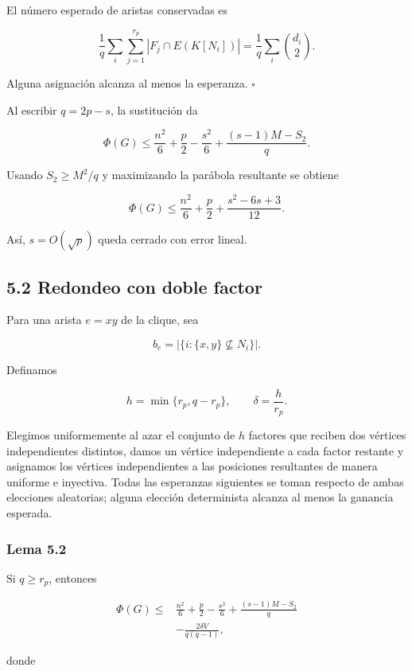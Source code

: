 \documentclass[
  11pt,
]{article}
\begin{document}
El número esperado de aristas conservadas es

\[
\frac1q\sum_i\sum_{j=1}^{r_p}|F_j\cap E(K[N_i])|
=
\frac1q\sum_i\binom{d_i}{2}.
\]

Alguna asignación alcanza al menos la esperanza. \(\square\)

Al escribir \(q=2p-s\), la sustitución da

\[
\Phi(G)
\le
\frac{n^2}{6}+\frac p2-\frac{s^2}{6}
+
\frac{(s-1)M-S_2}{q}.
\tag{5.2}
\]

Usando \(S_2\ge M^2/q\) y maximizando la parábola resultante se obtiene

\[
\boxed{
\Phi(G)
\le
\frac{n^2}{6}+\frac p2+\frac{s^2-6s+3}{12}.
}
\tag{5.3}
\]

Así, \(s=O(\sqrt p)\) queda cerrado con error lineal.

\subsection{5.2 Redondeo con doble
factor}\label{redondeo-con-doble-factor}

Para una arista \(e=xy\) de la clique, sea

\[
b_e=|\{i:\{x,y\}\not\subseteq N_i\}|.
\]

Definamos

\[
h=\min\{r_p,q-r_p\},
\qquad
\delta=\frac h{r_p}.
\]

Elegimos uniformemente al azar el conjunto de \(h\) factores que reciben
dos vértices independientes distintos, damos un vértice independiente a
cada factor restante y asignamos los vértices independientes a las
posiciones resultantes de manera uniforme e inyectiva. Todas las
esperanzas siguientes se toman respecto de ambas elecciones aleatorias;
alguna elección determinista alcanza al menos la ganancia esperada.

\subsubsection{Lema 5.2}\label{lema-5.2-desigualdad-de-doble-factor}

Si \(q\ge r_p\), entonces

\[
\boxed{
\begin{aligned}
\Phi(G)
\le{}&
\frac{n^2}{6}+\frac p2-\frac{s^2}{6}
+
\frac{(s-1)M-S_2}{q}\\
&-
\frac{2\delta V}{q(q-1)},
\end{aligned}
}
\tag{5.4}
\]

donde
\end{document}
